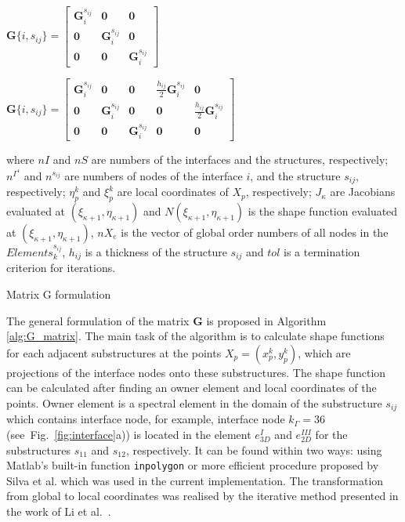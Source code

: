 \documentclass[a4paper,12pt]{article}
\begin{document}
{\begin{algorithm}
{{{				\(\mathbf{G}\{i,s_{ij}\}=\left[\begin{array}{ccc}
				\mathbf{G}^{s_{ij}}_i & \mathbf{0} & \mathbf{0}\\
				\mathbf{0} & \mathbf{G}^{s_{ij}}_i & \mathbf{0}\\
				\mathbf{0} & \mathbf{0} & \mathbf{G}^{s_{ij}}_i
				\end{array} \right]
				\)\;
			}
			 {
				
				\(\mathbf{G}\{i,s_{ij}\}=\left[\begin{array}{ccccc}
				\mathbf{G}^{s_{ij}}_i & \mathbf{0} & \mathbf{0} & 
				\frac{h_{ij}}{2}\mathbf{G}^{s_{ij}}_i & \mathbf{0}\\
				\mathbf{0} & \mathbf{G}^{s_{ij}}_i & \mathbf{0} & \mathbf{0} & 
				\frac{h_{ij}}{2}\mathbf{G}^{s_{ij}}_i\\
				\mathbf{0} & \mathbf{0} & \mathbf{G}^{s_{ij}}_i & \mathbf{0} & 
				\mathbf{0}
				\end{array} \right]
				\)\;	}
			
		}
	}
	where \(nI\) and \(nS\) are numbers of the interfaces and the structures, respectively; \(n^{\Gamma^i}\) and \(n^{s_{ij}}\) are numbers of nodes of the interface \(i\), and the structure \(s_{ij}\), respectively; \(\eta^k_p\) and  \(\xi^k_p\) are local coordinates of \(X_p\), respectively; \(J_{\kappa}\) are Jacobians evaluated at \((\xi_{\kappa+1},\eta_{\kappa+1})\) and \(N(\xi_{\kappa+1},\eta_{\kappa+1})\) is the shape function evaluated at \((\xi_{\kappa+1},\eta_{\kappa+1})\), \(nX_e\) is the vector of global order numbers of all nodes in the \(Elements^{s_{ij}}_k\), \(h_{ij}\) is a thickness of the structure \(s_{ij}\) and \(tol\) is a termination criterion for iterations.
	\caption{Matrix G formulation}
	\label{alg:G_matrix}
\end{algorithm}
The general formulation of the matrix \textbf{G} is proposed in Algorithm \ref{alg:G_matrix}.
The main task of the algorithm is to calculate shape functions for each adjacent substructures at the points \(X_p=(x_p^k,y_p^k)\), which are projections of the interface nodes onto these substructures.
The shape function can be calculated after finding an owner element and local coordinates of the points.
Owner element is a spectral element in the domain of the substructure \(s_{ij}\) which contains interface node, for example, interface node \(k_\Gamma=36\) (see~Fig.~\ref{fig:interface}a)) is located in the element \(e^{I}_{3D}\) and \(e^{III}_{2D}\) for the substructures \(s_{11}\) and \(s_{12}\), respectively.
It can be found within two ways: using Matlab's built-in function \verb+inpolygon+ or more efficient procedure proposed by Silva et al. \cite{silva2009exact} which was used in the current implementation.
The transformation from global to local coordinates was realised by the iterative method presented in the work of Li et al.~\cite{li2014efficient}.

}
\end{document}
